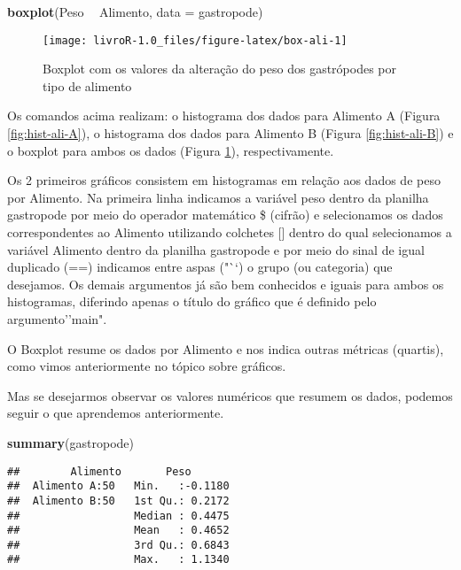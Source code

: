 \documentclass[14pt,titlepage, oneside, openany, a4paper]{book}
\newenvironment{Shaded}{\begin{snugshade}}{\end{snugshade}}
\newcommand{\DataTypeTok}[1]{\textcolor[rgb]{0.13,0.29,0.53}{#1}}
\newcommand{\KeywordTok}[1]{\textcolor[rgb]{0.13,0.29,0.53}{\textbf{#1}}}
\newcommand{\NormalTok}[1]{#1}
\newcommand{\OperatorTok}[1]{\textcolor[rgb]{0.81,0.36,0.00}{\textbf{#1}}}
\newcommand{\StringTok}[1]{\textcolor[rgb]{0.31,0.60,0.02}{#1}}
\begin{document}
\begin{Shaded}
\begin{Highlighting}[]
\KeywordTok{boxplot}\NormalTok{(Peso }\OperatorTok{~}\StringTok{ }\NormalTok{Alimento, }\DataTypeTok{data =}\NormalTok{ gastropode)}
\end{Highlighting}
\end{Shaded}

\begin{figure}[H]
\texttt{[image: livroR-1.0\_files/figure-latex/box-ali-1]} \caption{Boxplot com os valores da alteração do peso dos gastrópodes por tipo de alimento}\label{fig:box-ali}
\end{figure}

Os comandos acima realizam: o histograma dos dados para Alimento A (Figura \ref{fig:hist-ali-A}), o histograma dos dados para Alimento B (Figura \ref{fig:hist-ali-B}) e o boxplot para ambos os dados (Figura \ref{fig:box-ali}), respectivamente.

Os 2 primeiros gráficos consistem em histogramas em relação aos dados de peso por Alimento. Na primeira linha indicamos a variável peso dentro da planilha gastropode por meio do operador matemático \$ (cifrão) e selecionamos os dados correspondentes ao Alimento utilizando colchetes {[}{]} dentro do qual selecionamos a variável Alimento dentro da planilha gastropode e por meio do sinal de igual duplicado (==) indicamos entre aspas ("``) o grupo (ou categoria) que desejamos. Os demais argumentos já são bem conhecidos e iguais para ambos os histogramas, diferindo apenas o título do gráfico que é definido pelo argumento''main".

O Boxplot resume os dados por Alimento e nos indica outras métricas (quartis), como vimos anteriormente no tópico sobre gráficos.

Mas se desejarmos observar os valores numéricos que resumem os dados, podemos seguir o que aprendemos anteriormente.

\begin{Shaded}
\begin{Highlighting}[]
\KeywordTok{summary}\NormalTok{(gastropode)}
\end{Highlighting}
\end{Shaded}

\begin{verbatim}
##        Alimento       Peso        
##  Alimento A:50   Min.   :-0.1180  
##  Alimento B:50   1st Qu.: 0.2172  
##                  Median : 0.4475  
##                  Mean   : 0.4652  
##                  3rd Qu.: 0.6843  
##                  Max.   : 1.1340
\end{verbatim}
\end{document}
